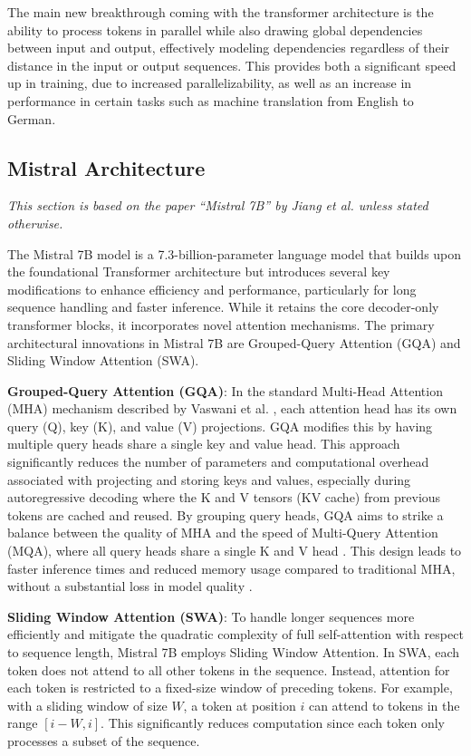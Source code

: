 The main new breakthrough coming with the transformer architecture is the ability to process tokens in parallel while also drawing global dependencies between input and output, effectively modeling dependencies regardless of their distance in the input or output sequences.
This provides both a significant speed up in training, due to increased parallelizability, as well as an increase in performance in certain tasks such as machine translation from English to German.
\subsection{Mistral Architecture}
\textit{This section is based on the paper ``Mistral 7B'' by Jiang et al. \cite{jiang2023mistral7b} unless stated otherwise.}

The Mistral 7B model is a 7.3-billion-parameter language model that builds upon the foundational Transformer architecture \cite{vaswani2017attention} but introduces several key modifications to enhance efficiency and performance, particularly for long sequence handling and faster inference. 
While it retains the core decoder-only transformer blocks, it incorporates novel attention mechanisms. 
The primary architectural innovations in Mistral 7B are Grouped-Query Attention (GQA) and Sliding Window Attention (SWA).

\textbf{Grouped-Query Attention (GQA)}:
In the standard Multi-Head Attention (MHA) mechanism described by Vaswani et al. \cite{vaswani2017attention}, each attention head has its own query (Q), key (K), and value (V) projections. 
GQA modifies this by having multiple query heads share a single key and value head. 
This approach significantly reduces the number of parameters and computational overhead associated with projecting and storing keys and values, especially during autoregressive decoding where the K and V tensors (KV cache) from previous tokens are cached and reused. 
By grouping query heads, GQA aims to strike a balance between the quality of MHA and the speed of Multi-Query Attention (MQA), where all query heads share a single K and V head \cite{shazeer2019fast}. This design leads to faster inference times and reduced memory usage compared to traditional MHA, without a substantial loss in model quality \cite{ainslie2023gqatraininggeneralizedmultiquery}.

\textbf{Sliding Window Attention (SWA)}:
To handle longer sequences more efficiently and mitigate the quadratic complexity of full self-attention with respect to sequence length, Mistral 7B employs Sliding Window Attention. In SWA, each token does not attend to all other tokens in the sequence. Instead, attention for each token is restricted to a fixed-size window of preceding tokens. For example, with a sliding window of size $W$, a token at position $i$ can attend to tokens in the range $[i-W, i]$. This significantly reduces computation since each token only processes a subset of the sequence.

